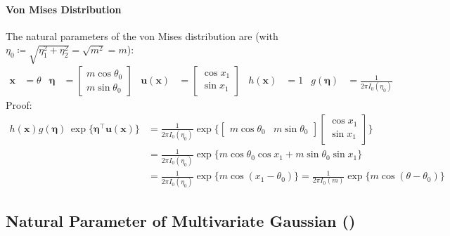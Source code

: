 \documentclass[11pt, a4paper]{scrartcl}
\newcommand{\transposed}{{\!\top\!}}
\renewcommand{\vec}[1]{\bm{#1}}
\newcommand{\diffstar}{\texorpdfstring{\raisebox{-1pt}{\resizebox{!}{8pt}{\(\star\)}}}{*}}
\newcommand{\onestar}  {(\diffstar)}
\begin{document}
			\paragraph{Von Mises Distribution}
				The natural parameters of the von Mises distribution are (with \( \eta_0 \coloneqq \sqrt{\eta_1^2 + \eta_2^2} = \sqrt{m^2} = m \)):
				\begin{align}
					\vec{x} &= \theta &
					\vec{\eta} &= \begin{bmatrix} m \cos\theta_0 \\ m \sin\theta_0 \end{bmatrix} &
					\vec{u}(\vec{x}) &= \begin{bmatrix} \cos x_1 \\ \sin x_1 \end{bmatrix} &
					h(\vec{x}) &= 1 &
					g(\vec{\eta}) &= \frac{1}{2 \pi I_0(\eta_0)}
				\end{align}
				Proof:
				\begin{align}
					h(\vec{x}) g(\vec{\eta}) \,\exp\Big\{ \vec{\eta}^\transposed \vec{u}(\vec{x}) \Big\}
						&= \frac{1}{2 \pi I_0(\eta_0)} \exp\Bigg\{ \begin{bmatrix} m \cos\theta_0 & m \sin\theta_0 \end{bmatrix} \begin{bmatrix} \cos x_1 \\ \sin x_1 \end{bmatrix} \Bigg\} \\
						&= \frac{1}{2 \pi I_0(\eta_0)} \exp\big\{ m \cos\theta_0 \cos x_1 + m \sin\theta_0 \sin x_1 \big\} \\
						&= \frac{1}{2 \pi I_0(\eta_0)} \exp\big\{ m \cos(x_1 - \theta_0) \big\}
						 = \frac{1}{2 \pi I_0(m)} \exp\big\{ m \cos(\theta - \theta_0) \big\}
				\end{align}

		\subsection{Natural Parameter of Multivariate Gaussian  \onestar}
\end{document}

